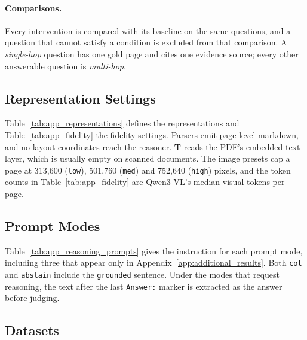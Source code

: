 \paragraph{Comparisons.}
Every intervention is compared with its baseline on the same questions, and a question that cannot satisfy a condition is excluded from that comparison. A \emph{single-hop} question has one gold page and cites one evidence source; every other answerable question is \emph{multi-hop}.

\subsection{Representation Settings}
\label{app:representation}




Table~\ref{tab:app_representations} defines the representations and Table~\ref{tab:app_fidelity} the fidelity settings. Parsers emit page-level markdown, and no layout coordinates reach the reasoner. \textbf{T} reads the PDF's embedded text layer, which is usually empty on scanned documents. The image presets cap a page at 313,600 (\texttt{low}), 501,760 (\texttt{med}) and 752,640 (\texttt{high}) pixels, and the token counts in Table~\ref{tab:app_fidelity} are Qwen3-VL's median visual tokens per page.

\subsection{Prompt Modes}
\label{app:reasoning}



Table~\ref{tab:app_reasoning_prompts} gives the instruction for each prompt mode, including three that appear only in Appendix~\ref{app:additional_results}. Both \texttt{cot} and \texttt{abstain} include the \texttt{grounded} sentence. Under the modes that request reasoning, the text after the last \texttt{Answer:} marker is extracted as the answer before judging.

\subsection{Datasets}
\label{app:datasets_evaluation}

